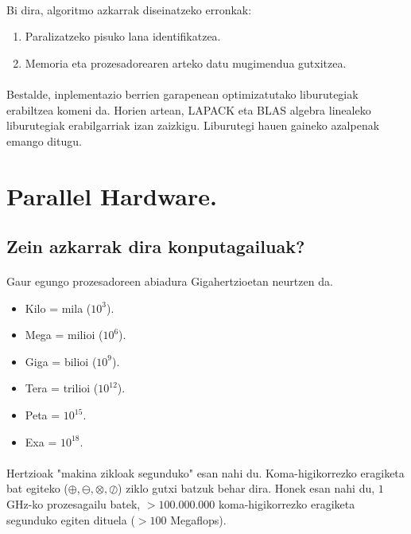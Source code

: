 \paragraph*{}Bi dira, algoritmo azkarrak diseinatzeko erronkak: 
\begin{enumerate}
\item Paralizatzeko pisuko lana identifikatzea.
\item Memoria eta prozesadorearen arteko datu mugimendua gutxitzea. 
\end{enumerate}

\paragraph*{}Bestalde, inplementazio berrien garapenean optimizatutako liburutegiak erabiltzea komeni da. Horien artean, LAPACK eta BLAS algebra linealeko liburutegiak erabilgarriak izan zaizkigu. Liburutegi hauen gaineko azalpenak emango ditugu.

\section{Parallel Hardware.}

\subsection*{\textbf{Zein azkarrak dira konputagailuak?}}

\paragraph*{}Gaur egungo prozesadoreen abiadura Gigahertzioetan neurtzen da. 

\begin{itemize}
\item Kilo = mila ($10^3$).
\item Mega = milioi ($10^6$).
\item Giga = bilioi ($10^9$).
\item Tera = trilioi ($10^{12}$).
\item Peta = $10^{15}$.
\item Exa = $10^{18}$. 
\end{itemize}

\paragraph*{} Hertzioak "makina zikloak segunduko" esan nahi du. Koma-higikorrezko  eragiketa bat egiteko ($\oplus,\ominus,\otimes,\oslash$) ziklo gutxi batzuk behar dira. Honek esan nahi du, $1$GHz-ko prozesagailu batek,
$>100.000.000$ koma-higikorrezko eragiketa segunduko egiten dituela ($>100$ Megaflops).

